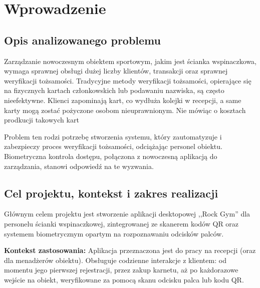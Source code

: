 \chapter{Wprowadzenie}
\label{cha:wprowadzenie}

\section{Opis analizowanego problemu}
\label{sec:opisProblemu}

Zarządzanie nowoczesnym obiektem sportowym, jakim jest ścianka wspinaczkowa, wymaga sprawnej obsługi dużej liczby klientów, transakcji oraz sprawnej weryfikacji tożsamości. Tradycyjne metody weryfikacji tożsamości, opierające się na fizycznych kartach członkowskich lub podawaniu nazwiska, są często nieefektywne. Klienci zapominają kart, co wydłuża kolejki w recepcji, a same karty mogą zostać pożyczone osobom nieuprawnionym. Nie mówiąc o kosztach prodkucji takowych kart

Problem ten rodzi potrzebę stworzenia systemu, który zautomatyzuje i zabezpieczy proces weryfikacji tożsamości, odciążając personel obiektu. Biometryczna kontrola dostępu, połączona z nowoczesną aplikacją do zarządzania, stanowi odpowiedź na te wyzwania.

\section{Cel projektu, kontekst i zakres realizacji}
\label{sec:celZakres}

Głównym celem projektu jest stworzenie aplikacji desktopowej ,,Rock Gym'' dla personelu ścianki wspinaczkowej, zintegrowanej ze skanerem kodów QR oraz systemem biometrycznym opartym na rozpoznawaniu odcisków palców.

\textbf{Kontekst zastosowania:}
Aplikacja przeznaczona jest do pracy na recepcji (oraz dla menadżerów obiektu). Obsługuje codzienne interakcje z klientem: od momentu jego pierwszej rejestracji, przez zakup karnetu, aż po każdorazowe wejście na obiekt, weryfikowane za pomocą skanu odcisku palca lub kodu QR.

